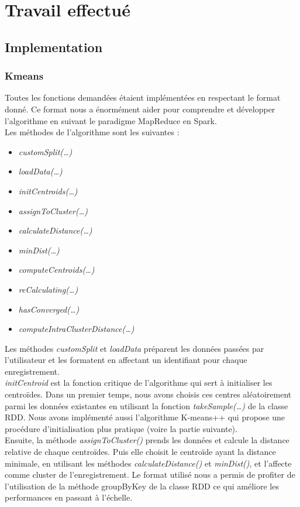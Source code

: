 \documentclass[french]{article}
\begin{document}
\section{Travail effectué}
\subsection{Implementation}
\subsubsection{Kmeans}
Toutes les fonctions demandées étaient implémentées en respectant le format donné. Ce format nous a énormément aider pour comprendre et développer l’algorithme en suivant le paradigme MapReduce en Spark.\\
Les méthodes de l’algorithme sont les suivantes :
\begin{itemize}
\item \textit{customSplit(…)}
\item \textit{loadData(…)}
\item \textit{initCentroids(…)}
\item \textit{assignToCluster(…)}
\item \textit{calculateDistance(…)}
\item \textit{minDist(…)}
\item \textit{computeCentroids(…)}
\item \textit{reCalculating(…)}
\item \textit{hasConverged(…)}
\item \textit{computeIntraClusterDistance(…)}
\end{itemize}

Les méthodes  \textit{customSplit} et  \textit{loadData} préparent les données passées par l’utilisateur et les formatent en affectant un identifiant pour chaque enregistrement.\\

 \textit{initCentroid} est la fonction critique de l’algorithme qui sert à initialiser les centroïdes. Dans un premier temps, nous avons choisis ces centres aléatoirement parmi les données existantes en utilisant la fonction \textit{takeSample(…)} de la classe RDD. Nous avons implémenté aussi l’algorithme K-means++ qui propose une procédure d’initialisation plus pratique (voire la partie suivante).\\

Ensuite, la méthode \textit{assignToCluster()} prends les données et calcule la distance relative de chaque centroïdes. Puis elle choisit le centroïde ayant la distance minimale, en utilisant les méthodes \textit{calculateDistance()} et \textit{minDist()}, et l’affecte comme cluster de l’enregistrement. Le format utilisé nous a permis de profiter de l’utilisation de la méthode groupByKey de la classe RDD ce qui améliore les performances en passant à l’échelle.\\
\end{document}
